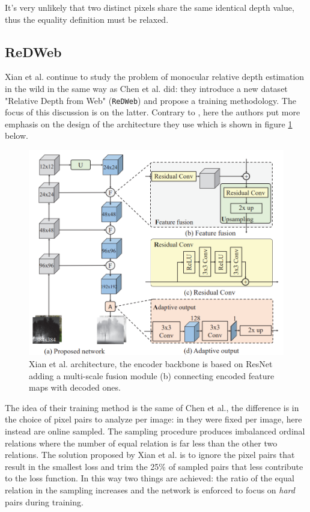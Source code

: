 It's very unlikely that two distinct pixels share the same identical depth value, thus the equality definition must be relaxed.

\subsection{ReDWeb}
Xian et al. \cite{ReDWeb} continue to study the problem of monocular relative depth estimation in the wild in the same way as Chen et al. \cite{DIW} did: they introduce a new dataset "Relative Depth from Web" (\texttt{ReDWeb}) and propose a training methodology.
The focus of this discussion is on the latter.
Contrary to \cite{DIW}, here the authors put more emphasis on the design of the architecture they use which is shown in figure \ref{fig:ReDWeb_architecture} below.

\begin{figure}
\centering
\includegraphics[scale=0.4]{figs/ReDWeb_architecture}
\caption{Xian et al. \cite{ReDWeb} architecture, the encoder backbone is based on ResNet \cite{ResNet} adding a multi-scale fusion module (b) connecting encoded feature maps with decoded ones. \label{fig:ReDWeb_architecture}}
\end{figure}

The idea of their training method is the same of Chen et al., the difference is in the choice of pixel pairs to analyze per image: in \cite{DIW} they were fixed per image, here instead are online sampled.
The sampling procedure produces imbalanced ordinal relations where the number of equal relation is far less than the other two relations.
The solution proposed by Xian et al. is to ignore the pixel pairs that result in the smallest loss and trim the 25\% of sampled pairs that less contribute to the loss function.
In this way two things are achieved: the ratio of the equal relation in the sampling increases and the network is enforced to focus on \textit{hard} pairs during training.

